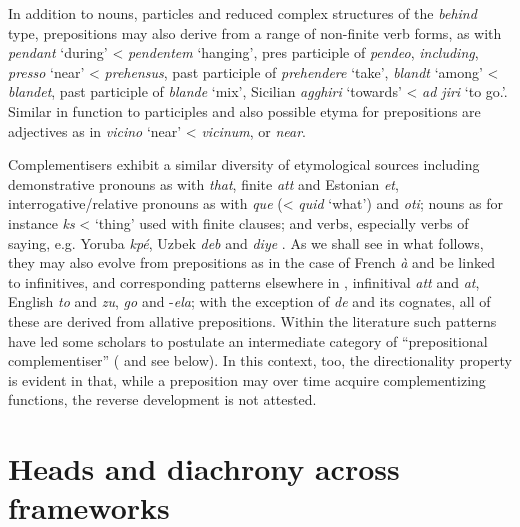 \documentclass[output=paper]{langsci/langscibook}
\begin{document}
In addition to nouns, particles and reduced complex structures of the
\emph{behind} type, prepositions may also derive from a range of non-finite
verb forms, as with  \emph{pendant} `during' < 
\emph{pendentem} `hanging', pres participle of \emph{pendeo}, 
\emph{including},  \emph{presso} `near' < 
\emph{prehensus}, past participle of \emph{prehendere} `take', 
\emph{blandt} `among' < \emph{blandet}, past participle of \emph{blande}
`mix', Sicilian \emph{agghiri} `towards' < \emph{ad jiri} `to go.\Inf{}'.
Similar in function to participles and also possible etyma for prepositions are
adjectives as in  \emph{vicino} `near' < 
\emph{vicinum}, or  \emph{near}.

Complementisers exhibit a similar diversity of etymological sources including
demonstrative pronouns as with  \emph{that},  finite
\emph{att} and Estonian \emph{et}, interrogative/relative pronouns  as with
 \emph{que} (<  \emph{quid} `what') and 
\emph{oti}; nouns as for instance  \emph{k\textepsilon s} <
`thing' used with finite clauses; and verbs, especially verbs of saying, e.g.
Yoruba \emph{kp\'e}, Uzbek \emph{deb} and  \emph{diye}
\citep[870--874]{KehaBoye16}. As we shall see in what follows, they may also
evolve from prepositions as in the case of French \emph{\`a} and be linked to
infinitives, and corresponding patterns elsewhere in ,
 infinitival \emph{att} and  \emph{at}, English
\emph{to} and  \emph{zu},  \emph{go} and 
-\emph{ela}; with the exception of \emph{de}  and its cognates, all of these
are derived from allative prepositions. Within the literature such patterns
have led some scholars to postulate an intermediate category of
\enquote{prepositional complementiser} (\citealt{Borsley86,Borsley01,Kayne99}
and see  below). In this context, too, the directionality
property is evident in that, while a preposition may over time acquire
complementizing functions, the reverse development is not attested.

\section{Heads and diachrony across frameworks}
\end{document}
